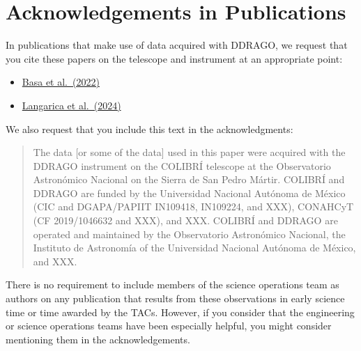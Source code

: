 \section{Acknowledgements in Publications}

In publications that make use of data acquired with DDRAGO, we request that you cite these papers on the telescope and instrument at an appropriate point:

\begin{itemize}
\item \href{https://ui.adsabs.harvard.edu/abs/2022SPIE12182E..1SB/abstract}{Basa et al.\ (2022)}
\item \href{https://ui.adsabs.harvard.edu/abs/2024SPIE13096E..3DL/abstract}{Langarica et al.\ (2024)}

\end{itemize}

We also request that you include this text in the acknowledgments:

\begin{quote}
The data [or some of the data] used in this paper were acquired with the DDRAGO instrument on the COLIBRÍ telescope at the Observatorio Astronómico Nacional on the Sierra de San Pedro Mártir. COLIBRÍ and DDRAGO are funded by the Universidad Nacional Autónoma de México (CIC and DGAPA/PAPIIT IN109418, IN109224, and XXX), CONAHCyT (CF 2019/1046632 and XXX), and XXX. COLIBRÍ and DDRAGO are operated and maintained by the Observatorio Astronómico Nacional, the Instituto de Astronomía of the Universidad Nacional Autónoma de México, and XXX.
\end{quote}

There is no requirement to include members of the science operations team as authors on any publication that results from these observations in early science time or time awarded by the TACs. However, if you consider that the engineering or science operations teams have been especially helpful, you might consider mentioning them in the acknowledgements.
